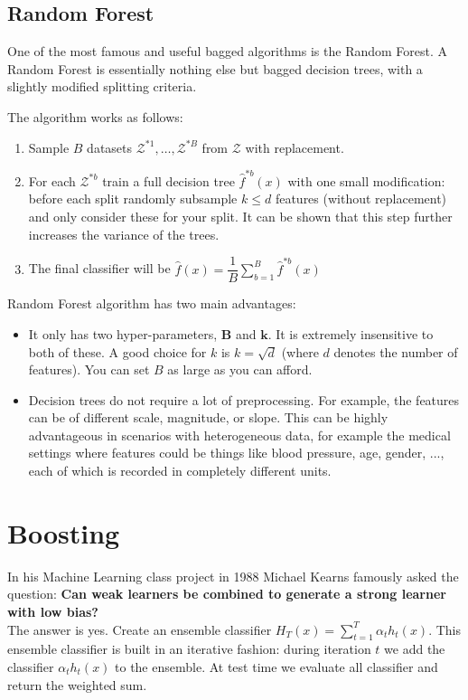 \documentclass[twoside]{article}
\begin{document}
\subsection{Random Forest}

One of the most famous and useful bagged algorithms is the Random Forest. A Random Forest is essentially nothing else but bagged decision trees, with a slightly modified splitting criteria.

The algorithm works as follows:

\begin{enumerate}
    \item Sample $B$ datasets $\mathcal{Z}^{*1},\ldots,\mathcal{Z}^{*B}$  from $\mathcal{Z}$ with replacement.
    \item For each $\mathcal{Z}^{*b}$ train a full decision tree $\hat{f}^{*b}(x)$ with one small modification: before each split randomly subsample $k \leq d$ features (without replacement) and only consider these for your split.
    It can be shown that this step further increases the variance of the trees.
    \item The final classifier will be $\hat{f}(x) = \dfrac{1}{B} \sum_{b=1}^{B}\hat{f}^{*b}(x)$
\end{enumerate}

Random Forest algorithm has two main advantages:

\begin{itemize}
    \item It only has two hyper-parameters, $\mathbf{B}$ and $\mathbf{k}$. It is extremely insensitive to both of these. A good choice for $k$ is $k=\sqrt{d}$ (where $d$ denotes the number of features). You can set $B$ as large as you can afford.
    \item Decision trees do not require a lot of preprocessing. For example, the features can be of different scale, magnitude, or slope. This can be highly advantageous in scenarios with heterogeneous data, for example the medical settings where features could be things like blood pressure, age, gender, ..., each of which is recorded in completely different units.
\end{itemize}

\section{Boosting}
In his Machine Learning class project in 1988 Michael Kearns famously asked the question: \textbf{Can weak learners be combined to generate a strong learner with low bias?} \\ The answer is yes. Create an ensemble classifier $H_{T}(x) =\sum_{t=1}^{T} \alpha_{t} h_{t}(x)$. This ensemble classifier is built in an iterative fashion: during iteration $t$ we add the classifier $\alpha_{t} h_{t}(x)$ to the ensemble. At test time we evaluate all classifier and return the weighted sum.
\end{document}

